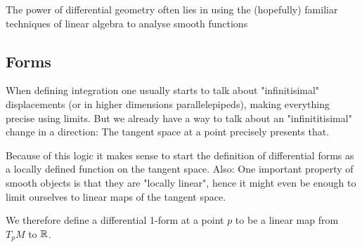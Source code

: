 \begin{remark}
The power of differential geometry often lies in using the (hopefully)
familiar techniques of linear algebra to analyse smooth functions
% 
\end{remark}

\subsection*{Forms}
When defining integration one usually starts to talk about "infinitisimal"
displacements (or in higher dimensions parallelepipeds), making everything
precise using limits. But we already have a way to talk about an "infinititisimal"
change in a direction: The tangent space at a point precisely presents that.

Because of this logic it makes sense to start the definition of differential forms
as a locally defined function on the tangent space. Also: One important property of
smooth objects is that they are "locally linear", hence it might even be enough to
limit ourselves to linear maps of the tangent space.

We therefore define a differential 1-form at a point $p$ to be a linear map from
$T_pM$ to $\mathbb{R}$.

